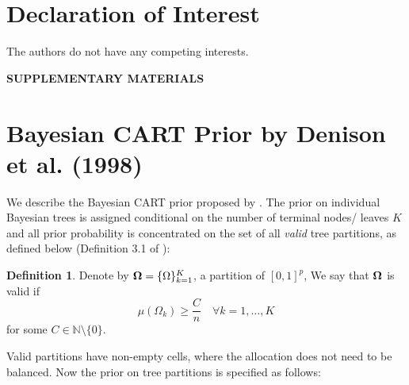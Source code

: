 \documentclass[12pt]{article}
\newcommand{\1}{\mathbb{I}}
\def\bOmega{\mbox{\boldmath$\Omega$}}
\theoremstyle{plain}
\theoremstyle{definition}
\newtheorem{definition}[theorem]{Definition}
\theoremstyle{remark}
\begin{document}
\section{Declaration of Interest}
The authors do not have any competing interests.



\newpage
\appendix
\bigskip
\begin{center}
{\large\bf SUPPLEMENTARY MATERIALS}
\end{center}
\renewcommand{\thetable}{S\arabic{table}}
\setcounter{table}{0}

\section{Bayesian CART Prior by Denison et al. (1998)}\label{denison_prior}
We describe the Bayesian CART prior proposed by \cite{denison1998bayesian}. The prior on individual Bayesian trees is assigned conditional on the number of terminal nodes/ leaves $K$ and all prior probability is concentrated on the set of all {\it valid} tree partitions, as defined below (Definition 3.1 of \cite{rockova2020posterior}):
\begin{definition}
Denote by $\bOmega = \{\Omega\}_{k=1}^K$, a partition of $[0,1]^p$, We say that $\bOmega$ is valid if
\begin{equation}
    \mu(\Omega_k) \ge \frac{C}{n} \quad \forall k = 1, \dots, K
\end{equation}
for some $C \in \mathbb{N}\setminus\{0\}$.
\end{definition}
Valid partitions have non-empty cells, where the allocation does not need to be balanced. Now the prior on tree partitions is specified as follows:
\end{document}
